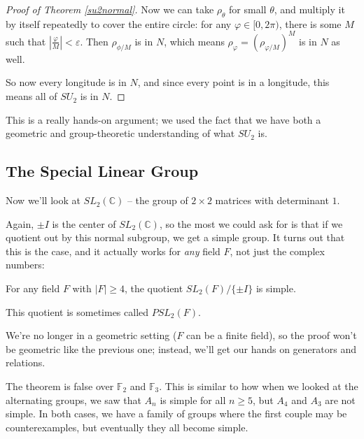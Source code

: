 \begin{proof}[Proof of Theorem \ref{su2normal}]
    Now we can take $\rho_\theta$ for small $\theta$, and multiply it by itself repeatedly to cover the entire circle: for any $\varphi \in [0, 2\pi)$, there is some $M$ such that $\left|\frac{\varphi}{M}\right| < \varepsilon$. Then $\rho_{\phi/M}$ is in $N$, which means $\rho_\varphi = (\rho_{\varphi/M})^M$ is in $N$ as well. 
    
    So now every longitude is in $N$, and since every point is in a longitude, this means all of $SU_2$ is in $N$. 
\end{proof}

\begin{note}
This is a really hands-on argument; we used the fact that we have both a geometric and group-theoretic understanding of what $SU_2$ is. 
\end{note}

\subsection{The Special Linear Group}

Now we'll look at $SL_2(\mathbb{C})$ -- the group of $2 \times 2$ matrices with determinant $1$. 

Again, $\pm I$ is the center of $SL_2(\mathbb{C})$, so the most we could ask for is that if we quotient out by this normal subgroup, we get a simple group. It turns out that this is the case, and it actually works for \emph{any} field $F$, not just the complex numbers:

\begin{theorem} \label{sl2simple}
    For any field $F$ with $|F| \geq 4$, the quotient $SL_2(F)/\{\pm I\}$ is simple. 
\end{theorem}

This quotient is sometimes called $PSL_2(F)$. 

We're no longer in a geometric setting ($F$ can be a finite field), so the proof won't be geometric like the previous one; instead, we'll get our hands on generators and relations. 

\begin{note}
The theorem is false over $\mathbb{F}_2$ and $\mathbb{F}_3$. This is similar to how when we looked at the alternating groups, we saw that $A_n$ is simple for all $n \geq 5$, but $A_4$ and $A_3$ are not simple. In both cases, we have a family of groups where the first couple may be counterexamples, but eventually they all become simple.
\end{note}

